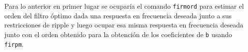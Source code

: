 \begin{enumerate}
Para lo anterior en primer lugar se ocuparía el comando \texttt{firmord} para estimar el orden del filtro óptimo dada una respuesta en frecuencia deseada junto a sus restricciones de ripple y luego ocupar esa misma respuesta en frecuencia deseada junto con el orden obtenido para la obtención de los coeficientes de \texttt{b} usando \texttt{firpm}.


\end{enumerate}
